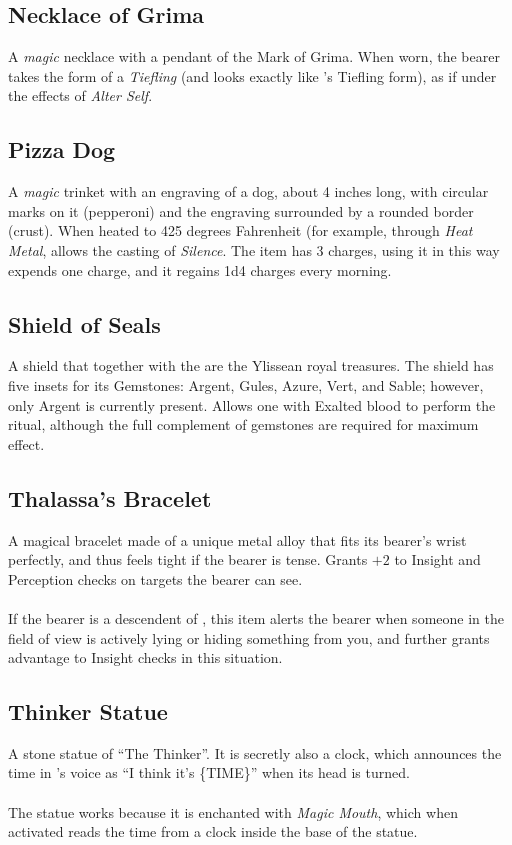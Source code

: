 \subsection{Necklace of Grima}
\label{items:grimanecklace}
A \textit{magic} necklace with a pendant of the Mark of Grima. When worn, the bearer takes the form of a \textit{Tiefling} (and looks exactly like 's Tiefling form), as if under the effects of \textit{Alter Self}.

\subsection{Pizza Dog}
\label{items:pizzadog}
A \textit{magic} trinket with an engraving of a dog, about 4 inches long, with circular marks on it (pepperoni) and the engraving surrounded by a rounded border (crust). When heated to 425 degrees Fahrenheit (for example, through \textit{Heat Metal}, allows the casting of \textit{Silence}. The item has 3 charges, using it in this way expends one charge, and it regains 1d4 charges every morning.

\subsection{Shield of Seals}
\label{items:fireemblem}
A shield that together with the  are the Ylissean royal treasures. The shield has five insets for its Gemstones: Argent, Gules, Azure, Vert, and Sable; however, only Argent is currently present. Allows one with Exalted blood to perform the  ritual, although the full complement of gemstones are required for maximum effect.

\subsection{Thalassa's Bracelet}
\label{items:bracelet}
A magical bracelet made of a unique metal alloy that fits its bearer's wrist perfectly, and thus feels tight if the bearer is tense. Grants $+2$ to Insight and Perception checks on targets the bearer can see.\\
\\
If the bearer is a descendent of , this item alerts the bearer when someone in the field of view is actively lying or hiding something from you, and further grants advantage to Insight checks in this situation.

\subsection{Thinker Statue}
\label{items:thinker}
A stone statue of ``The Thinker''. It is secretly also a clock, which announces the time in 's voice as ``I think it's \{TIME\}'' when its head is turned. \\
\\
The statue works because it is enchanted with \textit{Magic Mouth}, which when activated reads the time from a clock inside the base of the statue.

